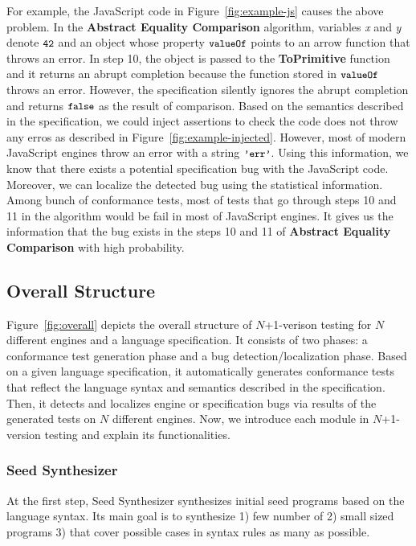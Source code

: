 For example, the JavaScript code in Figure~\ref{fig:example-js} causes the above
problem.  In the \textbf{Abstract Equality Comparison} algorithm, variables
\textit{x} and \textit{y} denote $\code{42}$ and an object whose property
$\code{valueOf}$ points to an arrow function that throws an error.  In step 10,
the object is passed to the \textbf{ToPrimitive} function and it returns an
abrupt completion because the function stored in $\code{valueOf}$ throws an
error.  However, the specification silently ignores the abrupt completion and
returns $\code{false}$ as the result of comparison.  Based on the semantics
described in the specification, we could inject assertions to check the code
does not throw any erros as described in Figure~\ref{fig:example-injected}.
However, most of modern JavaScript engines throw an error with a string
$\code{'err'}$.  Using this information, we know that there exists a potential
specification bug with the JavaScript code.  Moreover, we can localize the
detected bug using the statistical information. Among bunch of conformance
tests, most of tests that go through steps 10 and 11 in the algorithm would be
fail in most of JavaScript engines.  It gives us the information that the bug
exists in the steps 10 and 11 of \textbf{Abstract Equality Comparison} with high
probability.


\subsection{Overall Structure}

Figure~\ref{fig:overall} depicts the overall structure of $N$+1-verison testing
for $N$ different engines and a language specification.  It consists of two
phases: a conformance test generation phase and a bug detection/localization
phase.  Based on a given language specification, it automatically generates
conformance tests that reflect the language syntax and semantics described in
the specification.  Then, it detects and localizes engine or specification bugs
via results of the generated tests on $N$ different engines.  Now, we introduce
each module in $N$+1-version testing and explain its functionalities.
\newline

\subsubsection{Seed Synthesizer}
At the first step, \textsf{Seed Synthesizer} synthesizes initial seed programs
based on the language syntax.  Its main goal is to synthesize 1) few number of
2) small sized programs 3) that cover possible cases in syntax rules as many as
possible.
\newline

